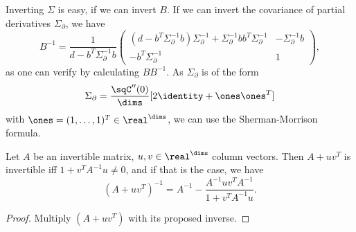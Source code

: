 Inverting \(\Sigma\) is easy, if we can invert \(B\). If we can invert the
covariance of partial derivatives \(\Sigma_\partial\), we have
\[
	B^{-1} = \frac1{d- b^T \Sigma_\partial^{-1}b}\begin{pmatrix}
		( d- b^T \Sigma_\partial^{-1}b )\Sigma_\partial^{-1}
		+ \Sigma_\partial^{-1}b b^T \Sigma_\partial^{-1}
		& -\Sigma_\partial^{-1} b\\
		-b^T\Sigma_\partial ^{-1} &  1
	\end{pmatrix},
\]
as one can verify by calculating \(BB^{-1}\). As \(\Sigma_\partial\) is of the form
\[
	\Sigma_\partial=\frac{\sqC''(0)}{\dims}[2\identity + \ones\ones^T]
\]
with \(\ones=(1,\dots,1)^T\in\real^\dims\), we can use the Sherman-Morrison
formula.

\begin{lemma}
	Let \(A\) be an invertible matrix, \(u,v\in\real^\dims\) column vectors.
	Then \(A+ uv^T\) is invertible iff \(1+v^T A^{-1}u \neq 0\), and if that is
	the case, we have
	\[
		(A+uv^T)^{-1} = A^{-1} - \frac{A^{-1}u v^T A^{-1}}{1+v^T A^{-1}u}.
	\]
\end{lemma}
\begin{proof}
	Multiply \((A+uv^T)\) with its proposed inverse.
\end{proof}

